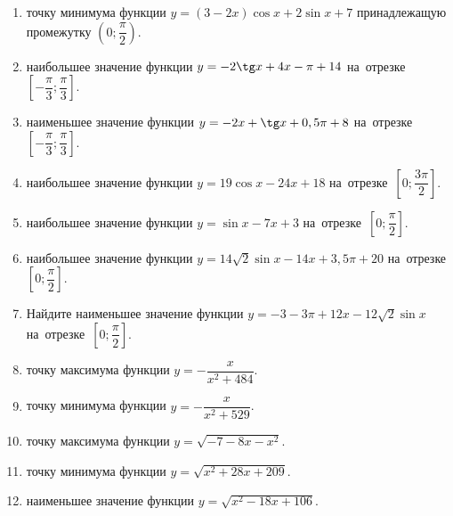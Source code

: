 \documentclass[a4paper,10pt]{article}
\begin{document}
\begin{enumerate}
\item {} точку минимума функции $y=\left(3-2x\right)\cos x +2\sin x+7$
принадлежащую промежутку $\left(0;\dfrac{\pi}{2}\right)$.

\item {} наибольшее значение функции $y=-2\tg x +4x-\pi +14$ на~отрезке~$\left[-\dfrac{\pi}{3};\dfrac{\pi}{3}\right]$.







\item {} наименьшее значение функции $y=-2x +\tg x+0,5\pi+8$ на~отрезке~$\left[-\dfrac{\pi}{3};\dfrac{\pi}{3}\right]$.







\item {} наибольшее значение функции $y=19\cos x-24x+18$ на~отрезке~$\left[0;\dfrac{3\pi}{2}\right]$.







\item {} наибольшее значение функции $y=\sin x-7x+3$ на~отрезке~$\left[0;\dfrac{\pi}{2}\right]$.







\item {} наибольшее значение функции $y=14\sqrt{2}\sin x-14x+3,5\pi +20$ на~отрезке~$\left[0;\dfrac{\pi}{2}\right]$.

\item Найдите наименьшее значение функции $y=-3-3\pi+12x-12\sqrt{2}\sin x$ на~отрезке~$\left[0;\dfrac{\pi}{2}\right]$.

\item {} точку максимума функции $y=-\dfrac{x}{ x^2 +484}$.

\item {} точку минимума функции $y=-\dfrac{x}{ x^2 +529}$.

\item {} точку максимума функции $y=\sqrt{-7-8x-x^2}$.

\item {} точку минимума функции $y=\sqrt{x^2+28x+209}$.

\item {} наименьшее значение функции $y=\sqrt{x^2-18x+106}$.


\end{enumerate}
\end{document}
